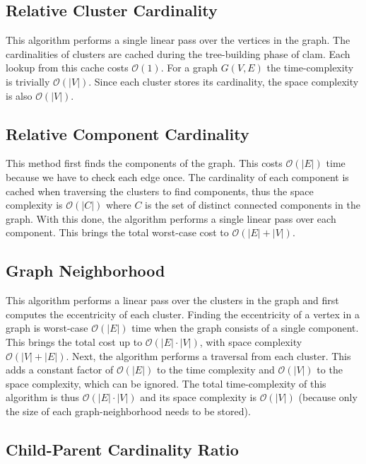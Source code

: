 \subsection{Relative Cluster Cardinality}

This algorithm performs a single linear pass over the vertices in the graph.
The cardinalities of clusters are cached during the tree-building phase of clam.
Each lookup from this cache costs $\mathcal{O}(1)$.
For a graph $G(V, E)$ the time-complexity is trivially $\mathcal{O}(|V|)$.
Since each cluster stores its cardinality, the space complexity is also $\mathcal{O}(|V|)$.

\subsection{Relative Component Cardinality}

This method first finds the components of the graph.
This costs $\mathcal{O}(|E|)$ time because we have to check each edge once.
The cardinality of each component is cached when traversing the clusters to find components, thus the space complexity is $\mathcal{O}(|C|)$ where $C$ is the set of distinct connected components in the graph.
With this done, the algorithm performs a single linear pass over each component.
This brings the total worst-case cost to $\mathcal{O}(|E| + |V|)$.

\subsection{Graph Neighborhood}

This algorithm performs a linear pass over the clusters in the graph and first computes the eccentricity of each cluster.
Finding the eccentricity of a vertex in a graph is worst-case $\mathcal{O}(|E|)$ time when the graph consists of a single component.
This brings the total cost up to $\mathcal{O}(|E| \cdot |V|)$, with space complexity $\mathcal{O}(|V|+|E|)$.
Next, the algorithm performs a traversal from each cluster.
This adds a constant factor of $\mathcal{O}(|E|)$ to the time complexity and $\mathcal{O}(|V|)$ to the space complexity, which can be ignored.
The total time-complexity of this algorithm is thus $\mathcal{O}(|E| \cdot |V|)$ and its space complexity is $\mathcal{O}(|V|)$ (because only the size of each graph-neighborhood needs to be stored).

\subsection{Child-Parent Cardinality Ratio}

